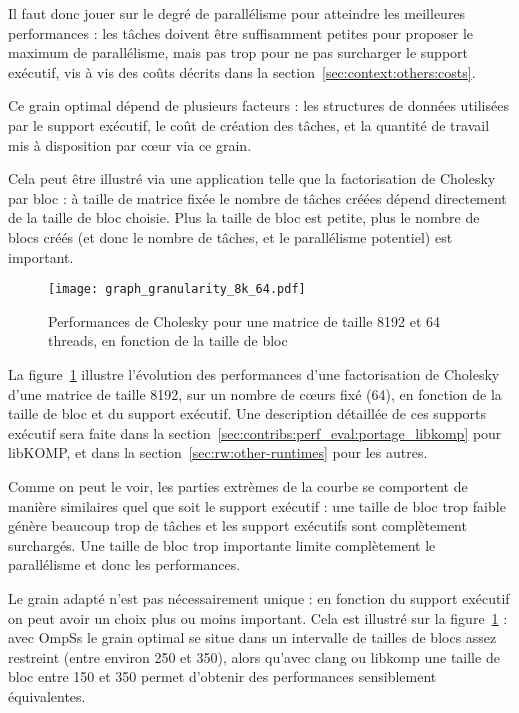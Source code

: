 Il faut donc jouer sur le degré de parallélisme pour atteindre les meilleures performances : les tâches doivent être suffisamment petites pour proposer le maximum de parallélisme, mais pas trop pour ne pas surcharger le support exécutif, vis à vis des coûts décrits dans la section~\ref{sec:context:others:costs}.

Ce grain optimal dépend de plusieurs facteurs : les structures de données utilisées par le support exécutif, le coût de création des tâches, et la quantité de travail mis à disposition par cœur via ce grain.

Cela peut être illustré via une application telle que la factorisation de Cholesky par bloc : à taille de matrice fixée le nombre de tâches créées dépend directement de la taille de bloc choisie.
Plus la taille de bloc est petite, plus le nombre de blocs créés (et donc le nombre de tâches, et le parallélisme potentiel) est important.

\begin{figure}[ht]
  \centering
  \texttt{[image: graph\_granularity\_8k\_64.pdf]}
  \caption{Performances de Cholesky pour une matrice de taille 8192 et 64 threads, en fonction de la taille de bloc}\label{fig:context:granularity}
\end{figure}

La figure~\ref{fig:context:granularity} illustre l'évolution des performances d'une factorisation de Cholesky d'une matrice de taille 8192, sur un nombre de cœurs fixé (64), en fonction de la taille de bloc et du support exécutif.
Une description détaillée de ces supports exécutif sera faite dans la section~\ref{sec:contribs:perf_eval:portage_libkomp} pour libKOMP, et dans la section~\ref{sec:rw:other-runtimes} pour les autres.

Comme on peut le voir, les parties extrèmes de la courbe se comportent de manière similaires quel que soit le support exécutif : une taille de bloc trop faible génère beaucoup trop de tâches et les support exécutifs sont complètement surchargés. Une taille de bloc trop importante limite complètement le parallélisme et donc les performances.

Le grain adapté n'est pas nécessairement unique : en fonction du support exécutif on peut avoir un choix plus ou moins important. Cela est illustré sur la figure~\ref{fig:context:granularity} : avec OmpSs le grain optimal se situe dans un intervalle de tailles de blocs assez restreint (entre environ 250 et 350), alors qu'avec clang ou libkomp une taille de bloc entre 150 et 350 permet d'obtenir des performances sensiblement équivalentes.

